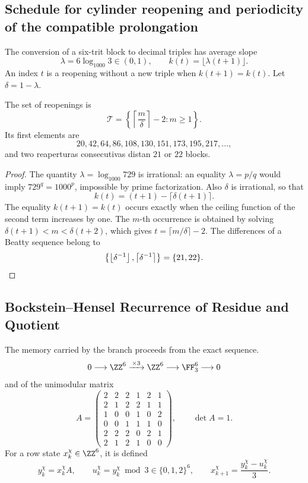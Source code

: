 \subsection{Schedule for cylinder reopening and periodicity of the compatible prolongation}

The conversion of a six-trit block to decimal triples has average slope
\[
\lambda=6\log_{1000}3\in(0,1),
\qquad k(t)=\lfloor\lambda(t+1)\rfloor.
\]
An index \(t\) is a reopening without a new triple when
\(k(t+1)=k(t)\). Let \(\delta=1-\lambda\).

\begin{theorem}
\label{thm:calendario-beatty}
The set of reopenings is
\[
\mathcal T=
\left\{\left\lceil\frac{m}{\delta}\right\rceil-2:m\ge1\right\}.
\]
Its first elements are
\[
20,42,64,86,108,130,151,173,195,217,\ldots,
\]
and two reaperturas consecutivas distan \(21\) or \(22\) blocks.
\end{theorem}

\begin{proof}
The quantity \(\lambda=\log_{1000}729\) is irrational: an equality
\(\lambda=p/q\) would imply \(729^q=1000^p\), impossible by prime
factorization. Also \(\delta\) is irrational, so that
\[
k(t)=(t+1)-\lceil\delta(t+1)\rceil.
\]
The equality \(k(t+1)=k(t)\) occurs exactly when the ceiling function of the
second term increases by one. The \(m\)-th occurrence is obtained
by solving
\(\delta(t+1)<m<\delta(t+2)\), which gives
\(t=\lceil m/\delta\rceil-2\). The differences of a Beatty sequence
belong to
\[
\left\{\left\lfloor\delta^{-1}\right\rfloor,
\left\lceil\delta^{-1}\right\rceil\right\}=\{21,22\}.\qedhere
\]
\end{proof}

\subsection{Bockstein--Hensel Recurrence of Residue and Quotient}

The memory carried by the branch proceeds from the exact sequence.
\[
0\longrightarrow\ZZ^6\xrightarrow{\,\times3\,}\ZZ^6
\longrightarrow\FF_3^6\longrightarrow0
\]
and of the unimodular matrix
\[
A=
\begin{pmatrix}
2&2&2&1&2&1\\
2&1&2&2&1&1\\
1&0&0&1&0&2\\
0&0&1&1&1&0\\
2&2&2&0&2&1\\
2&1&2&1&0&0
\end{pmatrix},
\qquad\det A=1.
\]
For a row state \(x_k^\chi\in\ZZ^6\), it is defined
\[
y_k^\chi=x_k^\chi A,
\qquad
u_k^\chi=y_k^\chi\bmod3\in\{0,1,2\}^6,
\qquad
x_{k+1}^\chi=\frac{y_k^\chi-u_k^\chi}{3}.
\]

